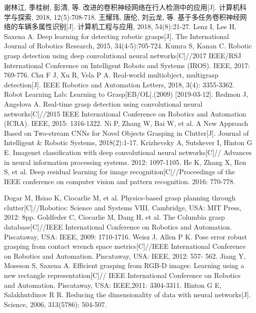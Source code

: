 \documentclass[no-math, withoutpreface]{YangThesis}
\begin{document}
\begin{thebibliography}{9}
 谢林江, 季桂树, 彭清, 等. 改进的卷积神经网络在行人检测中的应用[J].  计算机科学与探索,  2018,  12(5):708-718.
王耀玮, 唐伦, 刘云龙, 等. 基于多任务卷积神经网络的车辆多属性识别[J].  计算机工程与应用, 2018, 54(8):21-27.
 Lenz I, Lee H, Saxena A. Deep learning for detecting robotic grasps[J]. The International Journal of Robotics Research, 2015, 34(4-5):705-724.
 Kumra S, Kanan C. Robotic grasp detection using deep convolutional neural networks[C]//2017 IEEE/RSJ International Conference on Intelligent Robots and Systems (IROS). IEEE, 2017: 769-776.
 Chu F J, Xu R, Vela P A. Real-world multiobject, multigrasp detection[J]. IEEE Robotics and Automation Letters, 2018, 3(4): 3355-3362.
  Robot Learning Lab: Learning to Grasp[EB/OL].(2009) [2019-03-12].
  Redmon J, Angelova A. Real-time grasp detection using convolutional neural networks[C]//2015 IEEE International Conference on Robotics and Automation (ICRA). IEEE, 2015: 1316-1322.
 Ni P, Zhang W, Bai W, et al. A New Approach Based on Two-stream CNNs for Novel Objects Grasping in Clutter[J]. Journal of Intelligent \& Robotic Systems, 2018(2):1-17.
 Krizhevsky A, Sutskever I, Hinton G E. Imagenet classif\/ication with deep convolutional neural networks[C]// Advances in neural information processing systems. 2012: 1097-1105.
 He K, Zhang X, Ren S, et al. Deep residual learning for image recognition[C]//Proceedings of the IEEE conference on computer vision and pattern recognition. 2016: 770-778.

 Dogar M, Hsiao K, Ciocarlie M, et al. Physics-based grasp planning through clutter[C]//Robotics: Science and Systems VIII. Cambridge, USA: MIT Press, 2012: 8pp.
 Goldfeder C, Ciocarlie M, Dang H, et al. The Columbia grasp database[C]//IEEE International Conference on Robotics and Automation. Piscataway, USA: IEEE, 2009: 1710-1716.
 Weisz J, Allen P K. Pose error robust grasping from contact wrench space metrics[C]//IEEE International Conference on Robotics and Automation. Piscataway, USA: IEEE, 2012: 557- 562.
   Jiang Y, Moseson S, Saxena A. Eff\/icient grasping from RGB-D images: Learning using a new rectangle representation[C]// IEEE International Conference on Robotics and Automation. Piscataway, USA: IEEE,2011: 3304-3311.
  Hinton G E, Salakhutdinov R R. Reducing the dimensionality of data with neural networks[J]. Science, 2006, 313(5786): 504-507.


\end{thebibliography}
\end{document}
